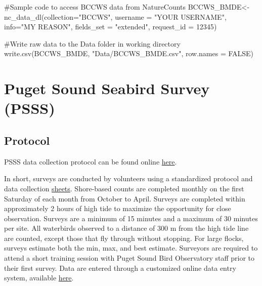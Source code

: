 \documentclass[
  letterpaper,
  DIV=11,
  numbers=noendperiod]{scrreprt}
\newenvironment{Shaded}{\begin{snugshade}}{\end{snugshade}}
\newcommand{\AttributeTok}[1]{\textcolor[rgb]{0.40,0.45,0.13}{#1}}
\newcommand{\CommentTok}[1]{\textcolor[rgb]{0.37,0.37,0.37}{#1}}
\newcommand{\ConstantTok}[1]{\textcolor[rgb]{0.56,0.35,0.01}{#1}}
\newcommand{\DecValTok}[1]{\textcolor[rgb]{0.68,0.00,0.00}{#1}}
\newcommand{\FunctionTok}[1]{\textcolor[rgb]{0.28,0.35,0.67}{#1}}
\newcommand{\NormalTok}[1]{\textcolor[rgb]{0.00,0.23,0.31}{#1}}
\newcommand{\OtherTok}[1]{\textcolor[rgb]{0.00,0.23,0.31}{#1}}
\newcommand{\StringTok}[1]{\textcolor[rgb]{0.13,0.47,0.30}{#1}}
\begin{document}
\begin{Shaded}
\begin{Highlighting}[]
\CommentTok{\#Sample code to access BCCWS data from NatureCounts}
\NormalTok{ BCCWS\_BMDE}\OtherTok{\textless{}{-}}\FunctionTok{nc\_data\_dl}\NormalTok{(}\AttributeTok{collection=}\StringTok{"BCCWS"}\NormalTok{, }\AttributeTok{username =} \StringTok{"YOUR USERNAME"}\NormalTok{, }\AttributeTok{info=}\StringTok{"MY REASON"}\NormalTok{, }\AttributeTok{fields\_set =} \StringTok{"extended"}\NormalTok{, }\AttributeTok{request\_id =} \DecValTok{12345}\NormalTok{)}

\CommentTok{\#Write raw data to the \textasciigrave{}Data\textasciigrave{} folder in working directory}
\FunctionTok{write.csv}\NormalTok{(BCCWS\_BMDE, }\StringTok{"Data/BCCWS\_BMDE.csv"}\NormalTok{, }\AttributeTok{row.names =} \ConstantTok{FALSE}\NormalTok{)}
\end{Highlighting}
\end{Shaded}

\section{Puget Sound Seabird Survey (PSSS)}\label{2.2Data}

\subsection{Protocol}\label{protocol-1}

PSSS data collection protocol can be found online
\href{https://seattleaudubon.org/wp-content/uploads/2021/01/PSSS_Protocol_2014-15.pdf}{here}.

In short, surveys are conducted by volunteers using a standardized
protocol and data collection
\href{https://seattleaudubon.org/wp-content/uploads/2021/09/PSSS-Datasheet.pdf}{sheets}.
Shore-based counts are completed monthly on the first Saturday of each
month from October to April. Surveys are completed within approximately
2 hours of high tide to maximize the opportunity for close observation.
Surveys are a minimum of 15 minutes and a maximum of 30 minutes per
site. All waterbirds observed to a distance of 300 m from the high tide
line are counted, except those that fly through without stopping. For
large flocks, surveys estimate both the min, max, and best estimate.
Surveyors are required to attend a short training session with Puget
Sound Bird Observatory staff prior to their first survey. Data are
entered through a customized online data entry system, available
\href{http://seabirdsurvey.org/seabirdsurvey/}{here}.
\end{document}
